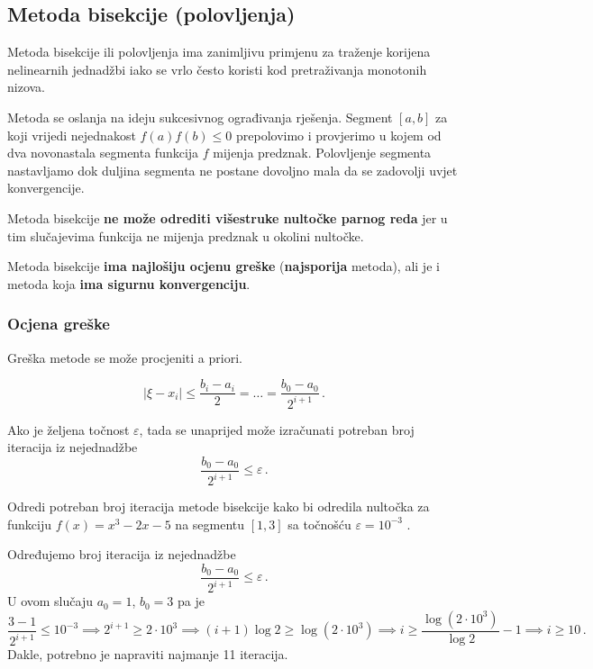 \subsection{Metoda bisekcije (polovljenja)}

Metoda bisekcije ili polovljenja ima zanimljivu primjenu za traženje korijena
nelinearnih jednadžbi iako se vrlo često koristi kod pretraživanja monotonih
nizova.

Metoda se oslanja na ideju sukcesivnog ograđivanja rješenja. Segment $[a, b]$ za
koji vrijedi nejednakost $f(a)f(b) \leq 0$ prepolovimo i provjerimo u kojem od
dva novonastala segmenta funkcija $f$ mijenja predznak. Polovljenje segmenta
nastavljamo dok duljina segmenta ne postane dovoljno mala da se zadovolji uvjet
konvergencije.

Metoda bisekcije \textbf{ne može odrediti višestruke nultočke parnog reda} jer u
tim slučajevima funkcija ne mijenja predznak u okolini nultočke.

Metoda bisekcije \textbf{ima najlošiju ocjenu greške} (\textbf{najsporija}
metoda), ali je i metoda koja \textbf{ima sigurnu konvergenciju}.


\subsubsection{Ocjena greške}

Greška metode se može procjeniti a priori.

$$
    |\xi - x_i| \leq \frac{b_i-a_i}{2} = \dots = \frac{b_0 - a_0}{2^{i+1}}\,.
$$

Ako je željena točnost $\varepsilon$, tada se unaprijed može izračunati potreban
broj iteracija iz nejednadžbe
$$
    \frac{b_0 - a_0}{2^{i+1}} \leq \varepsilon\,.
$$

\begin{example}
    Odredi potreban broj iteracija metode bisekcije kako bi odredila nultočka za
    funkciju $f(x) = x^3 - 2x - 5$ na segmentu $[1,3]$ sa točnošću $\varepsilon
    = 10^{-3}$ .
\end{example}

Određujemo broj iteracija iz nejednadžbe
$$
    \frac{b_0 - a_0}{2^{i+1}} \leq \varepsilon\,.
$$
U ovom slučaju $a_0 = 1$, $b_0 = 3$ pa je
$$
    \frac{3 - 1}{2^{i+1}} \leq 10^{-3} \implies 2^{i+1} \geq 2 \cdot 10^3 \implies
    (i + 1) \log 2 \geq \log (2 \cdot 10^3) \implies i \geq \frac{\log (2 \cdot 10^3)}{\log 2} - 1 \implies i \geq 10\,.
$$
Dakle, potrebno je napraviti najmanje 11 iteracija.

